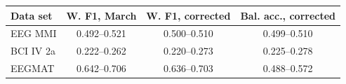 \begin{tabular}{@{}lccc@{}}
\toprule
Data set & W. F1, March & W. F1, corrected & Bal. acc., corrected \\
\midrule
EEG MMI & 0.492--0.521 & 0.500--0.510 & 0.499--0.510 \\
BCI IV 2a & 0.222--0.262 & 0.220--0.273 & 0.225--0.278 \\
EEGMAT & 0.642--0.706 & 0.636--0.703 & 0.488--0.572 \\
\bottomrule
\end{tabular}
